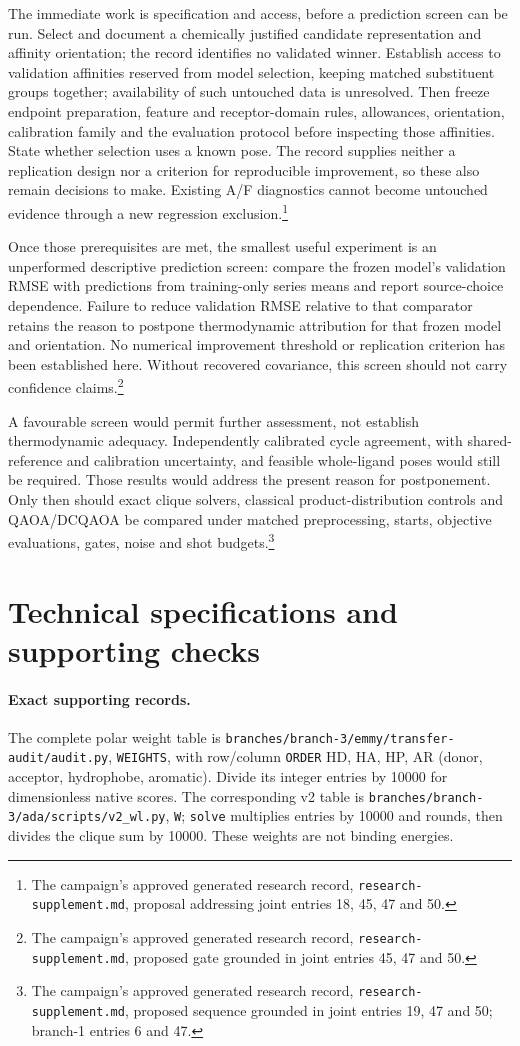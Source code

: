 \documentclass{article}
\newcommand{\rr}[1]{\footnote{The campaign's approved generated research record, \texttt{research-supplement.md}, #1.}}
\begin{document}
The immediate work is specification and access, before a prediction screen can be run. Select and document a chemically justified candidate representation and affinity orientation; the record identifies no validated winner. Establish access to validation affinities reserved from model selection, keeping matched substituent groups together; availability of such untouched data is unresolved. Then freeze endpoint preparation, feature and receptor-domain rules, allowances, orientation, calibration family and the evaluation protocol before inspecting those affinities. State whether selection uses a known pose. The record supplies neither a replication design nor a criterion for reproducible improvement, so these also remain decisions to make. Existing A/F diagnostics cannot become untouched evidence through a new regression exclusion.\rr{proposal addressing joint entries 18, 45, 47 and 50}

Once those prerequisites are met, the smallest useful experiment is an unperformed descriptive prediction screen: compare the frozen model's validation RMSE with predictions from training-only series means and report source-choice dependence. Failure to reduce validation RMSE relative to that comparator retains the reason to postpone thermodynamic attribution for that frozen model and orientation. No numerical improvement threshold or replication criterion has been established here. Without recovered covariance, this screen should not carry confidence claims.\rr{proposed gate grounded in joint entries 45, 47 and 50}

A favourable screen would permit further assessment, not establish thermodynamic adequacy. Independently calibrated cycle agreement, with shared-reference and calibration uncertainty, and feasible whole-ligand poses would still be required. Those results would address the present reason for postponement. Only then should exact clique solvers, classical product-distribution controls and QAOA/DCQAOA be compared under matched preprocessing, starts, objective evaluations, gates, noise and shot budgets.\rr{proposed sequence grounded in joint entries 19, 47 and 50; branch-1 entries 6 and 47}

\appendix
\section{Technical specifications and supporting checks}

\paragraph{Exact supporting records.}
The complete polar weight table is \texttt{branches/branch-3/emmy/transfer-audit/audit.py}, \texttt{WEIGHTS}, with row/column \texttt{ORDER} HD, HA, HP, AR (donor, acceptor, hydrophobe, aromatic). Divide its integer entries by 10000 for dimensionless native scores. The corresponding v2 table is \texttt{branches/branch-3/ada/scripts/v2\_wl.py}, \texttt{W}; \texttt{solve} multiplies entries by 10000 and rounds, then divides the clique sum by 10000. These weights are not binding energies.
\end{document}
